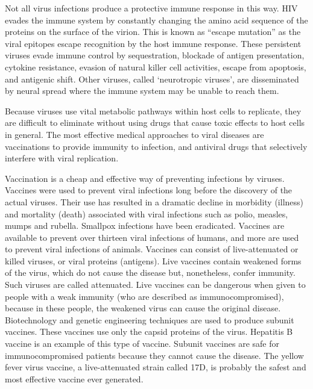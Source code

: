 Not all virus infections produce a protective immune response in this way. HIV evades the immune system by constantly changing the amino acid sequence of the proteins on the surface of the virion. This is known as ``escape mutation'' as the viral epitopes escape recognition by the host immune response. These persistent viruses evade immune control by sequestration, blockade of antigen presentation, cytokine resistance, evasion of natural killer cell activities, escape from apoptosis, and antigenic shift. Other viruses, called `neurotropic viruses', are disseminated by neural spread where the immune system may be unable to reach them.

Because viruses use vital metabolic pathways within host cells to replicate, they are difficult to eliminate without using drugs that cause toxic effects to host cells in general. The most effective medical approaches to viral diseases are vaccinations to provide immunity to infection, and antiviral drugs that selectively interfere with viral replication.

Vaccination is a cheap and effective way of preventing infections by viruses. Vaccines were used to prevent viral infections long before the discovery of the actual viruses. Their use has resulted in a dramatic decline in morbidity (illness) and mortality (death) associated with viral infections such as polio, measles, mumps and rubella. Smallpox infections have been eradicated. Vaccines are available to prevent over thirteen viral infections of humans, and more are used to prevent viral infections of animals. Vaccines can consist of live-attenuated or killed viruses, or viral proteins (antigens). Live vaccines contain weakened forms of the virus, which do not cause the disease but, nonetheless, confer immunity. Such viruses are called attenuated. Live vaccines can be dangerous when given to people with a weak immunity (who are described as immunocompromised), because in these people, the weakened virus can cause the original disease. Biotechnology and genetic engineering techniques are used to produce subunit vaccines. These vaccines use only the capsid proteins of the virus. Hepatitis B vaccine is an example of this type of vaccine. Subunit vaccines are safe for immunocompromised patients because they cannot cause the disease. The yellow fever virus vaccine, a live-attenuated strain called 17D, is probably the safest and most effective vaccine ever generated.

